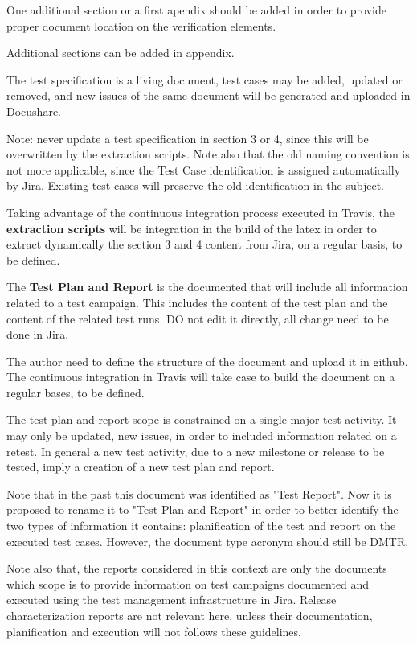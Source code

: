One additional section or a first apendix should be added in order to provide proper document location on the verification elements.

Additional sections can be added in appendix.

The test specification is a living document, test cases may be added, updated or removed, and new issues of the same document will be generated and uploaded in Docushare.

Note: never update a test specification in section 3 or 4, since this will be overwritten by the extraction scripts. Note also that the old naming convention is not more applicable, since the Test Case identification is assigned automatically by Jira. Existing test cases will preserve the old identification in the subject.

Taking advantage of the continuous integration process executed in Travis, the {\bf extraction scripts} will be integration in the build of the latex in order to extract dynamically the section 3 and 4 content from Jira, on a regular basis, to be defined.


The {\bf Test Plan and Report} is the documented that will include all information related to a test campaign. This includes the content of the test plan and the content of the related test runs. DO not edit it directly, all change need to be done in Jira.

The author need to define the structure of the document and upload it in github. The continuous integration in Travis will take case to build the document on a regular bases, to be defined.

The test plan and report scope is constrained on a single major test activity. It may only be updated, new issues, in order to included information related on a retest.
In general a new test activity, due to a new milestone or release to be tested, imply a creation of a new test plan and report.

Note that in the past this document was identified as "Test Report".
Now it is proposed to rename it to "Test Plan and Report" in order to better identify the two types of information it contains: planification of the test and report on the executed test cases. However, the document type acronym should still be DMTR. 

Note also that, the reports considered in this context are only the documents which scope is to provide information on test campaigns documented and executed using the test management infrastructure in Jira. Release characterization reports are not relevant here, unless their documentation, planification and execution will not follows these guidelines.


